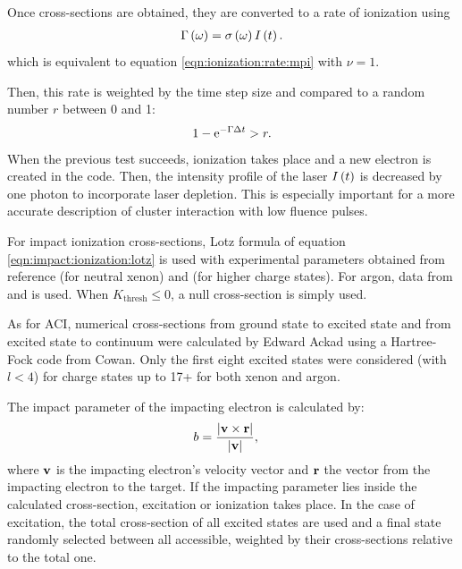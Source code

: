 Once cross-sections are obtained, they are converted to a rate of ionization
using
\begin{align}
\Gamma\left( \omega \right) = \sigma\left( \omega \right) I\left( t \right).
\label{eqn:ionization:rate:single}
\end{align}
which is equivalent to equation \eqref{eqn:ionization:rate:mpi} with $\nu = 1$.

Then, this rate is weighted\cite{Lax2006} by the time step size and compared to
a random number $r$ between 0 and 1:
\begin{align}
1 - \textrm{e}^{-\Gamma \Delta t} > r.
\label{eqn:ionization:prob}
\end{align}
When the previous test succeeds, ionization takes place and a new electron is
created in the code.
Then, the intensity profile of the laser $I\left( t \right)$ is decreased
by one photon
%
to incorporate laser depletion. This is especially important
for a more accurate description of cluster interaction with low fluence pulses.



For impact ionization cross-sections, Lotz formula of equation
\eqref{eqn:impact:ionization:lotz} is used with experimental parameters obtained
from reference \cite{Tawara1987} (for neutral xenon)
and \cite{Heidenreich2005} (for higher charge states).
For argon, data from \cite{Lotz1967} and \cite{Lotz1970} is used.
When $K_{\textrm{thresh}} \le 0$, a null cross-section is simply used.

As for ACI, numerical cross-sections from ground state to excited state and from
excited state to continuum were calculated by Edward Ackad using a
Hartree-Fock code from Cowan\cite{Cowan1981,CowanCode}. Only the first eight excited states
were considered (with $l<4$) for charge states up to 17+ for both xenon and argon.

The impact parameter of the impacting electron is calculated by:
\begin{align}
b & = \frac{\left| \textbf{v} \times \textbf{r} \right|}{\left| \textbf{v} \right|},
\label{eqn:ionization:impact:parameter}
\end{align}
where $\textbf{v}$ is the impacting electron's velocity vector and $\textbf{r}$ the vector
from the impacting electron to the target. If the impacting parameter lies
inside the calculated cross-section, excitation or ionization takes place. In
the case of excitation, the total cross-section of all excited states are used
and a final state randomly selected between all accessible, weighted by their
cross-sections relative to the total one.

